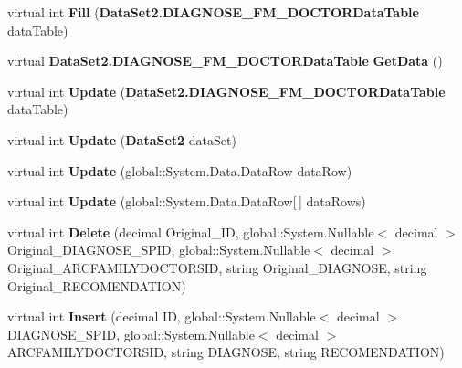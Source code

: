\begin{CompactItemize}
\item 
virtual int \textbf{Fill} ({\bf DataSet2.DIAGNOSE\_\-FM\_\-DOCTORDataTable} dataTable)\label{class_automatic_medical_system_1_1_data_set2_table_adapters_1_1_d_i_a_g_n_o_s_e___f_m___d_o_c_t_o_r_table_adapter_4f5437bc6141ddc87babac423e195fb2}

\item 
virtual {\bf DataSet2.DIAGNOSE\_\-FM\_\-DOCTORDataTable} \textbf{GetData} ()\label{class_automatic_medical_system_1_1_data_set2_table_adapters_1_1_d_i_a_g_n_o_s_e___f_m___d_o_c_t_o_r_table_adapter_e9db718bf2833b90e33ef30589de9752}

\item 
virtual int \textbf{Update} ({\bf DataSet2.DIAGNOSE\_\-FM\_\-DOCTORDataTable} dataTable)\label{class_automatic_medical_system_1_1_data_set2_table_adapters_1_1_d_i_a_g_n_o_s_e___f_m___d_o_c_t_o_r_table_adapter_6c9e8d175b696464abc241a55abf10c5}

\item 
virtual int \textbf{Update} ({\bf DataSet2} dataSet)\label{class_automatic_medical_system_1_1_data_set2_table_adapters_1_1_d_i_a_g_n_o_s_e___f_m___d_o_c_t_o_r_table_adapter_39d8f3fc3e980c698f3ed68389615c28}

\item 
virtual int \textbf{Update} (global::System.Data.DataRow dataRow)\label{class_automatic_medical_system_1_1_data_set2_table_adapters_1_1_d_i_a_g_n_o_s_e___f_m___d_o_c_t_o_r_table_adapter_316d83de0db7f018864f26971438634b}

\item 
virtual int \textbf{Update} (global::System.Data.DataRow[$\,$] dataRows)\label{class_automatic_medical_system_1_1_data_set2_table_adapters_1_1_d_i_a_g_n_o_s_e___f_m___d_o_c_t_o_r_table_adapter_05f23785d61a7915ed21bbc38c3e4d8e}

\item 
virtual int \textbf{Delete} (decimal Original\_\-ID, global::System.Nullable$<$ decimal $>$ Original\_\-DIAGNOSE\_\-SPID, global::System.Nullable$<$ decimal $>$ Original\_\-ARCFAMILYDOCTORSID, string Original\_\-DIAGNOSE, string Original\_\-RECOMENDATION)\label{class_automatic_medical_system_1_1_data_set2_table_adapters_1_1_d_i_a_g_n_o_s_e___f_m___d_o_c_t_o_r_table_adapter_9f00ae24df1fedaa42b999c672bec61e}

\item 
virtual int \textbf{Insert} (decimal ID, global::System.Nullable$<$ decimal $>$ DIAGNOSE\_\-SPID, global::System.Nullable$<$ decimal $>$ ARCFAMILYDOCTORSID, string DIAGNOSE, string RECOMENDATION)\label{class_automatic_medical_system_1_1_data_set2_table_adapters_1_1_d_i_a_g_n_o_s_e___f_m___d_o_c_t_o_r_table_adapter_7ea908b9c5182f3fd01fa4e5ec134169}


\end{CompactItemize}
